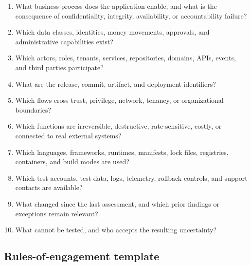 \documentclass[11pt,letterpaper]{article}
\begin{document}
\begin{enumerate}
  \item What business process does the application enable, and what is the consequence of confidentiality, integrity, availability, or accountability failure?
  \item Which data classes, identities, money movements, approvals, and administrative capabilities exist?
  \item Which actors, roles, tenants, services, repositories, domains, APIs, events, and third parties participate?
  \item What are the release, commit, artifact, and deployment identifiers?
  \item Which flows cross trust, privilege, network, tenancy, or organizational boundaries?
  \item Which functions are irreversible, destructive, rate-sensitive, costly, or connected to real external systems?
  \item Which languages, frameworks, runtimes, manifests, lock files, registries, containers, and build modes are used?
  \item Which test accounts, test data, logs, telemetry, rollback controls, and support contacts are available?
  \item What changed since the last assessment, and which prior findings or exceptions remain relevant?
  \item What cannot be tested, and who accepts the resulting uncertainty?
\end{enumerate}

\subsection{Rules-of-engagement template}
\end{document}
